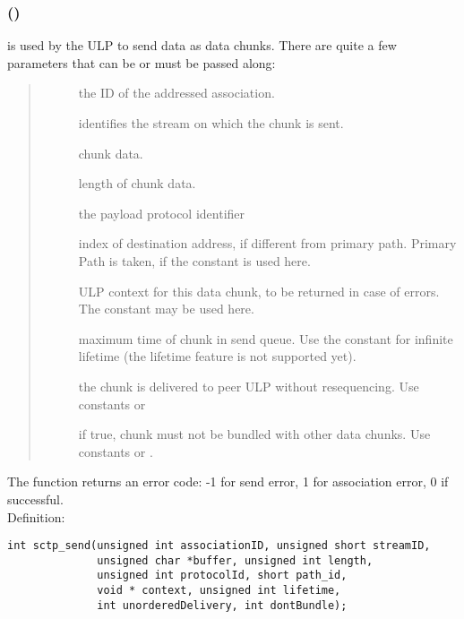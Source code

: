 \documentclass[10pt]{article}
\newcommand{\funchead}[1]{\index{#1}{\funcfont #1}()}
\newcommand{\bv}{\vspace{0,1cm}\noindent \\ Definition:\footnotesize\begin{verbatim}}
\newcommand{\n}{\normalsize}
\newcommand{\no}{ }
\begin{document}
\subsubsection{\funchead{sctp_send}}
\label{sctp-send}
 is used by the ULP to send data as data chunks. There
are quite a few parameters that can be or must be passed along:
\begin{quote} \begin{description} \no
\item[]  the ID of the addressed association.
\item[]       identifies the stream on which the chunk is sent.
\item[]         chunk data.
\item[]         length of chunk data.
\item[]     the payload protocol identifier
\item[] index of destination address, if different from primary path.
    Primary Path is taken, if the constant  is used here.
\item[]
    ULP context for this data chunk, to be returned in case of errors.
    The constant  may be used here.
\item[]         maximum time of chunk in send queue. Use the constant
     for infinite lifetime (the lifetime feature is not
    supported yet).
\item[] the chunk is delivered to peer ULP without resequencing.
    Use constants  or 
\item[]       if true, chunk must not be bundled with other data chunks.
    Use constants  or .
\end{description} \end{quote}
The function returns an error code: -1 for send error, 1 for association error, 0 if successful.
\bv
int sctp_send(unsigned int associationID, unsigned short streamID,
              unsigned char *buffer, unsigned int length,
              unsigned int protocolId, short path_id,
              void * context, unsigned int lifetime,
              int unorderedDelivery, int dontBundle);
\end{verbatim}\n
\end{document}
